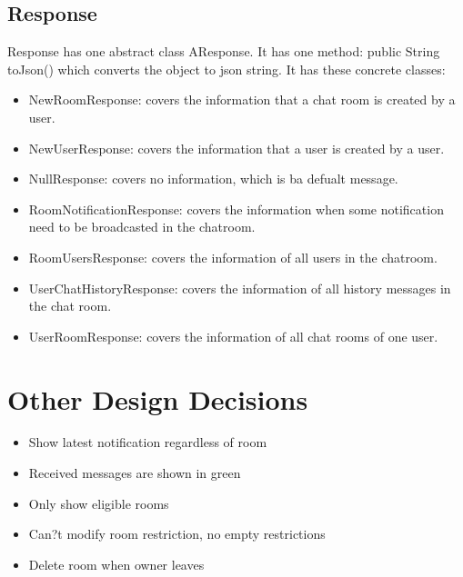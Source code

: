 \documentclass[letterpaper, 11pt]{article}
\begin{document}
\subsection{Response}
Response has one abstract class AResponse. It has one method: public String toJson() which converts the object to json string. It has these concrete classes:
\begin{itemize}
\item NewRoomResponse: covers the information that a chat room is created by a user.
\item NewUserResponse: covers the information that a user is created by a user.
\item NullResponse: covers no information, which is ba defualt message.
\item RoomNotificationResponse: covers the information when some notification need to be broadcasted in the chatroom. 
\item RoomUsersResponse: covers the information of all users in the chatroom.
\item UserChatHistoryResponse: covers the information of all history messages in the chat room.
\item UserRoomResponse: covers the information of all chat rooms of one user.
\end{itemize}


\section{Other Design Decisions}
\begin{itemize}
\item Show latest notification regardless of room
\item Received messages are shown in green
\item Only show eligible rooms
\item Can?t modify room restriction, no empty restrictions
\item Delete room when owner leaves
\end{itemize}

\end{document}
